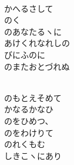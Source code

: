 \documentclass[10pt,b5j]{tarticle} %
\begin{document}
\vspace{1.5em} %
\newcommand{\linespace}{0.5em} %
\newcommand{\blocksize}{0.5\hsize} %
\newcommand{\itemmargin}{3em} %
\begin{enumerate} %
    \setlength{\itemindent}{\itemmargin} %
    \begin{minipage}[c]{\blocksize}
    
        \vspace{\linespace}
        \item~\\
        かへるさして\\
        のく\\
        のあなたるヽに\\
        あけくれなれしの\\
        びにふのに\\
        のまたおとづれぬ
        
    \end{minipage}
    \begin{minipage}[c]{\blocksize}
        
        \vspace{\linespace}
        \item~\\
        のもとえそめて\\
        かなるかなひ\\
        のをひめつ、\\
        のをわけりて\\
        のれくもむ\\
        しきこヽにあり
    
    \end{minipage}
\end{enumerate} %
\end{document}

